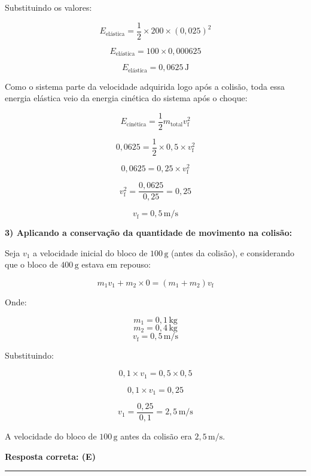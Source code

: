 \documentclass[a4paper,12pt]{article}
\begin{document}
\begin{flushleft}
Substituindo os valores:

\[
E_{\text{elástica}} = \frac{1}{2} \times 200 \times (0,025)^2
\]

\[
E_{\text{elástica}} = 100 \times 0,000625
\]

\[
E_{\text{elástica}} = 0,0625\,\mathrm{J}
\]

Como o sistema parte da velocidade adquirida logo após a colisão, toda essa energia elástica veio da energia cinética do sistema após o choque:

\[
E_{\text{cinética}} = \frac{1}{2} m_{\text{total}} v_{\text{f}}^2
\]

\[
0,0625 = \frac{1}{2} \times 0,5 \times v_{\text{f}}^2
\]

\[
0,0625 = 0,25 \times v_{\text{f}}^2
\]

\[
v_{\text{f}}^2 = \frac{0{,}0625}{0{,}25} = 0{,}25
\]

\[
\boxed{
v_{\text{f}} = 0{,}5\,\mathrm{m/s}
}
\]

\textbf{3) Aplicando a conservação da quantidade de movimento na colisão:}

Seja $v_1$ a velocidade inicial do bloco de $100\,\mathrm{g}$ (antes da colisão), e considerando que o bloco de $400\,\mathrm{g}$ estava em repouso:

\[
m_1 v_1 + m_2 \times 0 = (m_1 + m_2) v_{\text{f}}
\]

Onde:

\[
m_1 = 0,1\,\mathrm{kg}
\]
\[
m_2 = 0,4\,\mathrm{kg}
\]
\[
v_{\text{f}} = 0,5\,\mathrm{m/s}
\]

Substituindo:

\[
0,1 \times v_1 = 0,5 \times 0,5
\]

\[
0,1 \times v_1 = 0,25
\]

\[
v_1 = \frac{0{,}25}{0{,}1} = 2{,}5\,\mathrm{m/s}
\]

A velocidade do bloco de $100\,\mathrm{g}$ antes da colisão era $2{,}5\,\mathrm{m/s}$.

\textbf{Resposta correta: \colorbox{green!50}{(E)}}

\end{flushleft}
\noindent\rule{\linewidth}{0.6pt}\\
\end{document}
